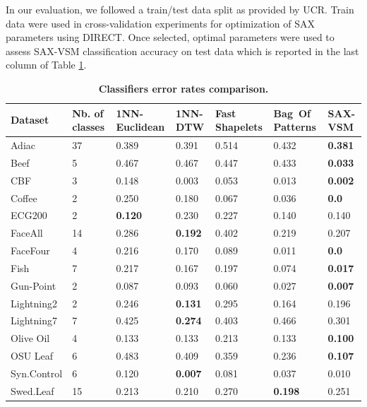 \documentclass[conference]{IEEEtran}
\begin{document}
In our evaluation, we followed a train/test data split as provided by UCR. 
Train data were used in cross-validation experiments for optimization of 
SAX parameters using \mbox{DIRECT}. 
Once selected, optimal parameters were used to assess SAX-VSM classification 
accuracy on test data which is reported in the last column of Table \ref{perf_table}.

\begin{footnotesize}
\begin{table}[t]
\vspace{-0.3cm}
\caption{\bf Classifiers error rates comparison.}
 \label{perf_table}
\centering
\begin{tabularx}{\linewidth}{@{} l *6X @{}}
\hline
Dataset & Nb. of classes & 1NN-Euclidean & 1NN-DTW & Fast Shapelets &  \mbox{Bag Of} \mbox{Patterns}
& SAX-VSM\\
\hline
Adiac        &37  & 0.389   & 0.391  & 0.514  & 0.432  & \textbf{0.381}\\
Beef         &5   & 0.467   & 0.467  & 0.447  & 0.433  & \textbf{0.033}\\
CBF         & 3  & 0.148    & 0.003  & 0.053    & 0.013 & \textbf{0.002} \\
Coffee       &2    & 0.250   & 0.180  & 0.067     & 0.036     & \textbf{0.0} \\
ECG200     &2   & \textbf{0.120}  & 0.230  & 0.227     & 0.140   & 0.140 \\
FaceAll      &14  & 0.286   & \textbf{0.192}  & 0.402     & 0.219   & 0.207\\
FaceFour    &4   & 0.216   & 0.170  & 0.089     & 0.011   & \textbf{0.0} \\
Fish         &7   & 0.217   & 0.167  & 0.197    & 0.074   & \textbf{0.017} \\
Gun-Point    &2   & 0.087   & 0.093  & 0.060     & 0.027     & \textbf{0.007} \\
Lightning2    &2   & 0.246   & \textbf{0.131}  & 0.295  & 0.164  & 0.196 \\
Lightning7    &7   & 0.425   & \textbf{0.274}  & 0.403  & 0.466  & 0.301 \\
Olive Oil     &4   & 0.133   & 0.133  & 0.213     & 0.133  & \textbf{0.100}\\
OSU Leaf    &6   & 0.483   & 0.409  & 0.359     & 0.236  & \textbf{0.107} \\
Syn.Control  &6   & 0.120   & \textbf{0.007}  & 0.081     & 0.037  & 0.010 \\
Swed.Leaf   &15  & 0.213   & 0.210 & 0.270 & \textbf{0.198} & 0.251 \\

\end{tabularx}
\end{table}
\end{footnotesize}
\end{document}
